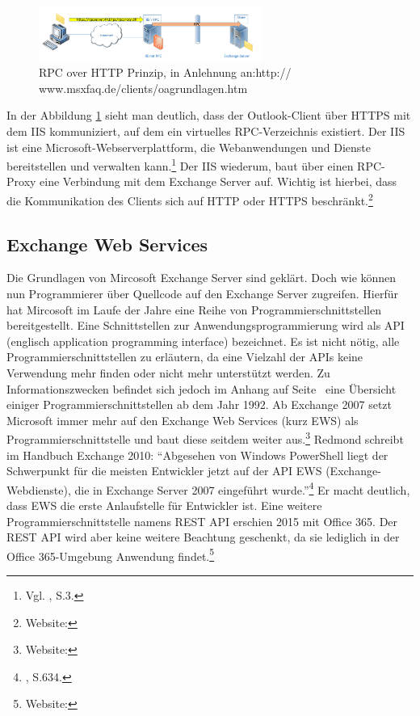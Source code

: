 \begin{figure}[h!]
\centering
\includegraphics[width=0.65\textwidth]{Abbildungen/RPC_HTTP.png}
	\caption[RPC over HTTP Prinzip]{RPC over HTTP Prinzip,  in Anlehnung an:http://
	www.msxfaq.de/clients/oagrundlagen.htm}
	\label{fig:RPC_HTTP}
\end{figure}

\noindent
In der Abbildung \ref{fig:RPC_HTTP} sieht man deutlich, dass der Outlook-Client über HTTPS mit dem IIS kommuniziert, auf dem ein virtuelles RPC-Verzeichnis existiert. Der IIS ist eine Microsoft-Webserverplattform, die Webanwendungen und Dienste bereitstellen und verwalten kann.\footnote{Vgl. \citeauthor{Volodarsky} \citeyear{Volodarsky}, S.3.} Der IIS wiederum, baut über einen RPC-Proxy eine Verbindung mit dem Exchange Server auf. Wichtig ist hierbei, dass die Kommunikation des Clients sich auf HTTP oder HTTPS beschränkt.\footnote{Website:\cite{MSXoutlook}}


\subsection{Exchange Web Services}
\noindent
Die Grundlagen von Mircosoft Exchange Server sind geklärt. Doch wie können nun Programmierer über Quellcode auf den Exchange Server zugreifen. Hierfür hat Mircosoft im Laufe der Jahre eine Reihe von Programmierschnittstellen bereitgestellt. Eine Schnittstellen zur Anwendungsprogrammierung wird als API (englisch application programming interface) bezeichnet. Es ist nicht nötig, alle Programmierschnittstellen zu erläutern, da eine Vielzahl der APIs keine Verwendung mehr finden oder nicht mehr unterstützt werden. Zu Informationszwecken befindet sich jedoch im Anhang auf Seite~\pageref{API_Geschichte} eine Übersicht einiger Programmierschnittstellen ab dem Jahr 1992. Ab Exchange 2007 setzt Microsoft immer mehr auf den Exchange Web Services (kurz EWS) als Programmierschnittstelle und baut diese seitdem weiter aus.\footnote{Website:\cite{MSXews}}
Redmond schreibt im Handbuch Exchange 2010: 
\enquote{Abgesehen von Windows PowerShell liegt der Schwerpunkt für die meisten Entwickler jetzt auf der API EWS (Exchange-Webdienste), die in Exchange Server 2007 eingeführt wurde.}\footnote{\citeauthor{Redmond} \citeyear{Redmond}, S.634.}
Er macht deutlich, dass EWS die erste Anlaufstelle für Entwickler ist. Eine weitere Programmierschnittstelle namens REST API erschien 2015 mit Office 365. Der REST API wird aber keine weitere Beachtung geschenkt, da sie lediglich in der Office 365-Umgebung Anwendung findet.\footnote{Website:\cite{MicrosoftAPI}}


